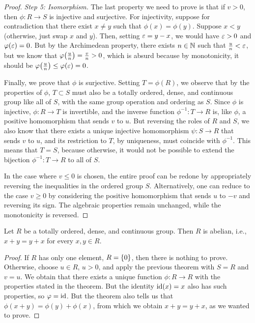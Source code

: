 \begin{proof}
\emph{Step 5: Isomorphism.} The last property we need to prove is that if $v > 0$, then $\phi\colon R\to S$ is injective and surjective. For injectivity, suppose for contradiction that there exist $x \neq y$ such that $\phi(x) = \phi(y)$. Suppose $x<y$ (otherwise, just swap $x$ and $y$). Then, setting $\varepsilon = y - x$, we would have $\varepsilon>0$ and $\varphi(\varepsilon)=0$. But by the Archimedean property, there exists $n\in {\mathbb N}$ such that $\frac u n < \varepsilon$, but we know that $\varphi{\left( \frac u n \right)} = \frac v n >0$, which is absurd because by monotonicity, it should be $\varphi{\left( \frac u n \right)} \le \varphi(\varepsilon) = 0$.

Finally, we prove that $\phi$ is surjective. Setting $T=\phi(R)$, we observe
that by the properties of $\phi$, $T\subset S$ must also be a totally ordered,
dense, and continuous group like all of $S$, with the same group operation and
ordering as $S$. Since $\phi$ is injective, $\phi\colon R\to T$ is invertible,
and the inverse function $\phi^{-1}\colon T\to R$ is, like $\phi$, a positive
homomorphism that sends $v$ to $u$. But reversing the roles of $R$ and $S$, we
also know that there exists a unique injective homomorphism $\psi\colon S\to R$
that sends $v$ to $u$, and its restriction to $T$, by uniqueness, must coincide
with $\phi^{-1}$. This means that $T=S$, because otherwise, it would not be
possible to extend the bijection $\phi^{-1}\colon T \to R$ to all of $S$.

In the case where $v\le 0$ is chosen, the entire proof can be redone by
appropriately reversing the inequalities in the ordered group $S$.
Alternatively, one can reduce to the case $v\ge 0$ by considering the positive
homomorphism that sends $u$ to $-v$ and reversing its sign. The algebraic
properties remain unchanged, while the monotonicity is reversed.
\end{proof}

\begin{theorem}[Commutativity]
    Let $R$ be a totally ordered, dense, and continuous group. Then $R$ is
  abelian, i.e., $x+y=y+x$ for every $x,y\in R$.
\end{theorem}
%
\begin{proof}
If $R$ has only one element, $R={\left\{ 0 \right\}}$, then there is nothing to prove.
Otherwise, choose $u\in R$, $u>0$, and apply the previous theorem with $S=R$ and
$v=u$. We obtain that there exists a unique function $\phi\colon R\to R$ with
the properties stated in the theorem. But the identity $\mathrm{id}(x)=x$ also has such
properties, so $\varphi =\mathrm{id}$. But the theorem also tells us that $\phi(x+y) =
\phi(y)+\phi(x)$, from which we obtain $x+y=y+x$, as we wanted to prove.
\end{proof}

